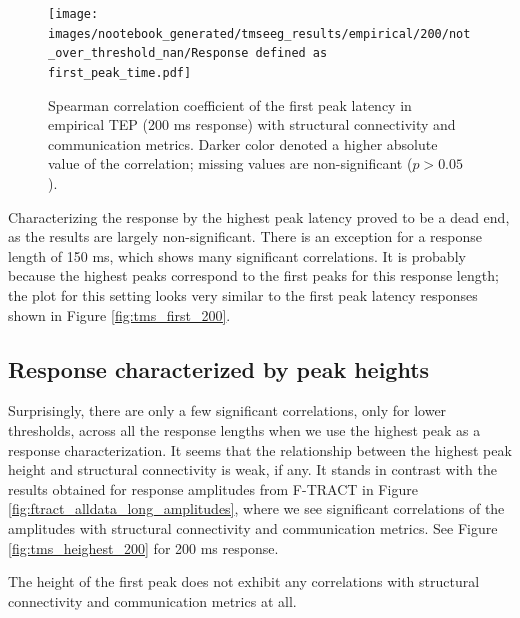 \begin{figure}
    \centering
    \texttt{[image: images/nootebook\_generated/tmseeg\_results/empirical/200/not\_over\_threshold\_nan/Response defined as first\_peak\_time.pdf]}
    \caption[TEPs first peak latency (200 ms) correlations]{Spearman correlation coefficient of the first peak latency in empirical TEP (200 ms response) with structural connectivity and communication metrics. Darker color denoted a higher absolute value of the correlation; missing values are non-significant ($p>0.05$).}
    \label{fig:tms_first_time_200}
\end{figure}

Characterizing the response by the highest peak latency proved to be a dead end, as the results are largely non-significant. There is an exception for a response length of 150 ms, which shows many significant correlations. It is probably because the highest peaks correspond to the first peaks for this response length; the plot for this setting looks very similar to the first peak latency responses shown in Figure \ref{fig:tms_first_200}. 

\subsection{Response characterized by peak heights}

Surprisingly, there are only a few significant correlations, only for lower thresholds, across all the response lengths when we use the highest peak as a response characterization. It seems that the relationship between the highest peak height and structural connectivity is weak, if any. It stands in contrast with the results obtained for response amplitudes from F-TRACT in Figure \ref{fig:ftract_alldata_long_amplitudes}, where we see significant correlations of the amplitudes with structural connectivity and communication metrics. See Figure \ref{fig:tms_heighest_200} for 200 ms response.

The height of the first peak does not exhibit any correlations with structural connectivity and communication metrics at all. 


